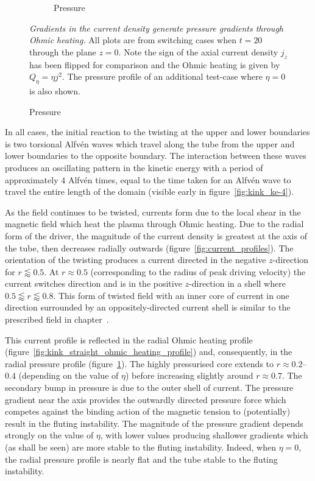 \documentclass[12pt]{article}
\newcommand{\mycaption}[2]{\caption[#1]{\emph{#1} #2}}
\begin{document}
\begin{figure}[t]
\begin{subfigure}{0.32\textwidth}
      \caption{Pressure}
      \label{fig:pressure_profiles}
    \end{subfigure}
  \mycaption{Gradients in the current density generate pressure gradients through Ohmic heating.}{All plots are from switching cases when $t=20$ through the plane $z=0$. Note the sign of the axial current density $j_z$ has been flipped for comparison and the Ohmic heating is given by $Q_{\eta} = \eta j^2$. The pressure profile of an additional test-case where $\eta=0$ is also shown.}%
  \label{fig:pressure_and_heating}
\end{figure}

In all cases, the initial reaction to the twisting at the upper and lower boundaries is two torsional Alfv\'en waves which travel along the tube from the upper and lower boundaries to the opposite boundary. The interaction between these waves produces an oscillating pattern in the kinetic energy with a period of approximately $4$ Alfv\'en times, equal to the time taken for an Alfv\'en wave to travel the entire length of the domain (visible early in figure~\ref{fig:kink_ke-4}).

As the field continues to be twisted, currents form due to the local shear in the magnetic field which heat the plasma through Ohmic heating. Due to the radial form of the driver, the magnitude of the current density is greatest at the axis of the tube, then decreases radially outwards (figure~\ref{fig:current_profiles}). The orientation of the twisting produces a current directed in the negative $z$-direction for $r\lessapprox0.5$. At $r \approx 0.5$ (corresponding to the radius of peak driving velocity) the current switches direction and is in the positive $z$-direction in a shell where $0.5\lessapprox r \lessapprox 0.8$. This form of twisted field with an inner core of current in one direction surrounded by an oppositely-directed current shell is similar to the prescribed field in chapter~\cite{quinnEffectAnisotropicViscosity2020a}.

This current profile is reflected in the radial Ohmic heating profile (figure~\ref{fig:kink_straight_ohmic_heating_profile}) and, consequently, in the radial pressure profile (figure~\ref{fig:pressure_profiles}). The highly pressurised core extends to $r\approx 0.2$--$0.4$ (depending on the value of $\eta$) before increasing slightly around $r\approx 0.7$. The secondary bump in pressure is due to the outer shell of current. The pressure gradient near the axis provides the outwardly directed pressure force which competes against the binding action of the magnetic tension to (potentially) result in the fluting instability.  The magnitude of the pressure gradient depends strongly on the value of $\eta$, with lower values producing shallower gradients which (as shall be seen) are more stable to the fluting instability. Indeed, when $\eta=0$, the radial pressure profile is nearly flat and the tube stable to the fluting instability.
\end{document}
